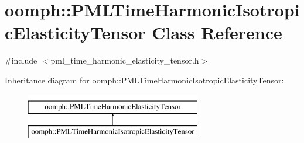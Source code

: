\hypertarget{classoomph_1_1PMLTimeHarmonicIsotropicElasticityTensor}{}\section{oomph\+:\+:P\+M\+L\+Time\+Harmonic\+Isotropic\+Elasticity\+Tensor Class Reference}
\label{classoomph_1_1PMLTimeHarmonicIsotropicElasticityTensor}


{\ttfamily \#include $<$pml\+\_\+time\+\_\+harmonic\+\_\+elasticity\+\_\+tensor.\+h$>$}

Inheritance diagram for oomph\+:\+:P\+M\+L\+Time\+Harmonic\+Isotropic\+Elasticity\+Tensor\+:\begin{figure}[H]
\begin{center}
\leavevmode
\includegraphics[height=2.000000cm]{classoomph_1_1PMLTimeHarmonicIsotropicElasticityTensor}
\end{center}
\end{figure}
